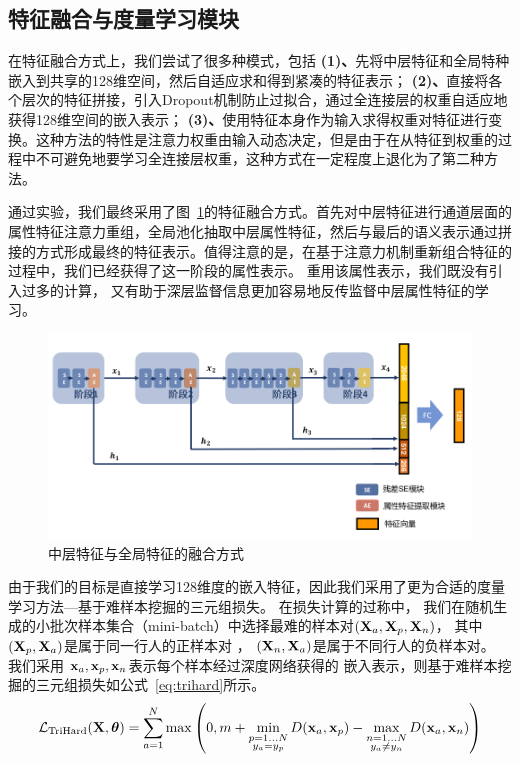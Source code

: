 
\subsection{特征融合与度量学习模块}

在特征融合方式上，我们尝试了很多种模式，包括
\textbf{(1)、}先将中层特征和全局特种嵌入到共享的128维空间，然后自适应求和得到紧凑的特征表示；
\textbf{(2)、}直接将各个层次的特征拼接，引入Dropout机制防止过拟合，通过全连接层的权重自适应地获得128维空间的嵌入表示；
\textbf{(3)、}使用特征本身作为输入求得权重对特征进行变换。这种方法的特性是注意力权重由输入动态决定，但是由于在从特征到权重的过程中不可避免地要学习全连接层权重，这种方式在一定程度上退化为了第二种方法。

通过实验，我们最终采用了图~\ref{fig:fusion}的特征融合方式。首先对中层特征进行通道层面的属性特征注意力重组，全局池化抽取中层属性特征，然后与最后的语义表示通过拼接的方式形成最终的特征表示。值得注意的是，在基于注意力机制重新组合特征的过程中，我们已经获得了这一阶段的属性表示。
重用该属性表示，我们既没有引入过多的计算，
又有助于深层监督信息更加容易地反传监督中层属性特征的学习。

\begin{figure}
	\centering
	\includegraphics[width=.9\textwidth]{fig/2018-05-11-16-54-07.png}
	\caption{中层特征与全局特征的融合方式}
	\label{fig:fusion}
\end{figure}

由于我们的目标是直接学习128维度的嵌入特征，因此我们采用了更为合适的度量学习方法---基于难样本挖掘的三元组损失\cite{hermans2017defense}。
在损失计算的过称中，
我们在随机生成的小批次样本集合（mini-batch）中选择最难的样本对$({\mathbf{X}}_a, {\mathbf{X}}_p, {\mathbf{X}}_n)$，
其中 $({\mathbf{X}}_p, {\mathbf{X}}_a)$是属于同一行人的正样本对
， $({\mathbf{X}}_n, {\mathbf{X}}_a)$是属于不同行人的负样本对。
我们采用 ${\mathbf{x}}_a, {\mathbf{x}}_p, {\mathbf{x}}_n$表示每个样本经过深度网络获得的
嵌入表示，则基于难样本挖掘的三元组损失如公式~\ref{eq:trihard}所示。
\begin{equation}
	\mathcal{L}_{\textrm{TriHard}} ({\mathbf{X}}, {\boldsymbol{\theta}}) = \sum_{a=1}^{N} \max\left(
	0, m + \min_{\substack{
			p=1...N \\
			y_a = y_p}
	} D({\mathbf{x}}_a, {\mathbf{x}}_p)
	-  \max_{ \substack{
			n=1...N \\
			y_a \neq y_n }
	} D({\mathbf{x}}_a,{\mathbf{x}}_n)
	\right) \label{eq:trihard}
\end{equation}

